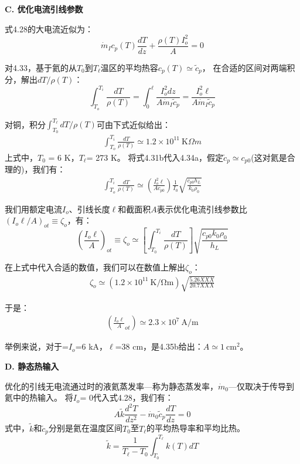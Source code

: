 \textbf{C. 优化电流引线参数}

式4.28的大电流近似为：
\begin{equation}%
\dot{m}_Ic_p(T)\frac{dT}{dz}+\frac{\rho(T)I_{o}^{2}}{A}=0
\end{equation}

对4.33，基于氦的从$T_0$到$T_{\ell}$温区的平均热容$c_p(T)\simeq \tilde{c}_p$，
在合适的区间对两端积分，解出$dT/\rho(T)$：
\begin{equation}%
\int_{T_o}^{T_i}\frac{dT}{\rho(T)}=\int_{0}^{\ell}\frac{I_{o}^{2}dz}{A\dot{m}_I\tilde{c}_p}=\frac{I_{o}^{2}\ell}{A\dot{m}_I\tilde{c}_p}
\end{equation}

对铜，积分$\int_{T_0}^{T_\ell} dT/\rho(T)$可由下式近似给出：
\begin{align*}%
\int_{T_o}^{T_i}\frac{dT}{\rho(T)}\simeq 1.2\times 10^{11}\ \mathrm{K}\Omega m\tag{4.34b}
\end{align*}
上式中，$T_0$ = 6 K，$T_\ell$= 273 K。
将式4.31b代入4.34a，假定$\tilde{c}_p\simeq c_{p0}$(这对氦是合理的)，我们有：
\begin{align*}%
\int_{T_o}^{T_i}\frac{dT}{\rho(T)}\simeq\left(\frac{I_{o}^{2}\ell}{Ac_{p0}}\right)\frac{1}{I_0}\sqrt{\frac{c_{p0}h_L}{k_0\rho_0}} \tag{4.34c}
\end{align*}

我们用额定电流$I_o$、引线长度$\ell$和截面积$A$表示优化电流引线参数比$(I_o \ell/A)_{ot}\equiv \zeta_o$，有：
\begin{equation}%
\left(\frac{I_o\ell}{A}\right)_{ot} \equiv \zeta_o\simeq\left[\int_{T_0}^{T_i}\frac{dT}{\rho(T)}\right]\sqrt{\frac{c_{p0}k_0 \rho_0}{h_L}}
\end{equation}

在上式中代入合适的数值，我们可以在数值上解出$\zeta_o$：
\begin{align*}
\zeta_o\simeq (1.2\times 10^11\ \mathrm{K/\Omega m})\sqrt{\frac{5.26XXX}{20.7XXX}}
\end{align*}

于是：
\begin{align*}%
(\frac{I_o\ell}{A}_{ot})\simeq2.3\times10^7\ \mathrm{A/m} \tag{4.35b}
\end{align*}

举例来说，对于=$I_o$=6 kA，$\ell$=38 cm，是4.35b给出：$A\simeq 1\ \mathrm{cm^2}$。

\textbf{D. 静态热输入}

优化的引线无电流通过时的液氦蒸发率---称为静态蒸发率，$\dot{m}_0$---仅取决于传导到氦中的热输入。
将$I_o$= 0代入式4.28，我们有：
\begin{equation}%
A\tilde{k}\frac{d^2T}{dz^2}-\dot{m}_0\tilde{c}_p\frac{dT}{dz}=0
\end{equation}
式中，$\tilde{k}$和$\tilde{c}_p$分别是氦在温度区间$T_0$至$T_\ell$的平均热导率和平均比热。
\begin{equation}%
\tilde{k}=\frac{1}{T_\ell-T_0}\int_{T_0}^{T_\ell}k(T)dT
\end{equation}

